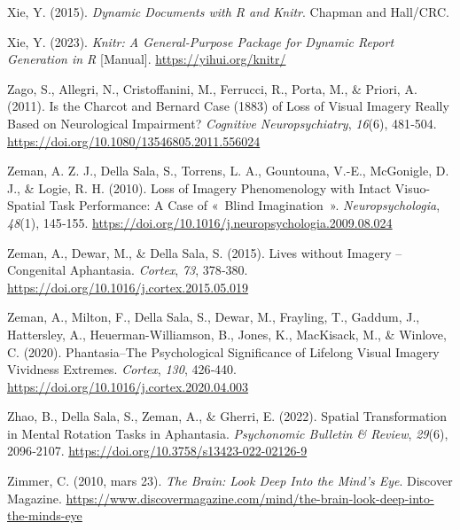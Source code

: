 \documentclass[
  12pt,
]{article}
\newlength{\cslhangindent}
\newlength{\cslentryspacingunit} %
\newenvironment{CSLReferences}[2] %
 {%
  \setlength{\parindent}{0pt}
  \ifodd #1
  \let\oldpar\par
  \def\par{\hangindent=\cslhangindent\oldpar}
  \fi
  \setlength{\parskip}{#2\cslentryspacingunit}
 }%
 {}
\begin{document}
\begin{CSLReferences}{1}{0}
\leavevmode{}%
Xie, Y. (2015). \emph{Dynamic Documents with {R} and Knitr}. {Chapman
and Hall/CRC}.

\leavevmode{}%
Xie, Y. (2023). \emph{Knitr: {A} General-Purpose Package for Dynamic
Report Generation in {R}} {[}Manual{]}. \url{https://yihui.org/knitr/}

\leavevmode{}%
Zago, S., Allegri, N., Cristoffanini, M., Ferrucci, R., Porta, M., \&
Priori, A. (2011). Is the {Charcot} and {Bernard} Case (1883) of Loss of
Visual Imagery Really Based on Neurological Impairment? \emph{Cognitive
Neuropsychiatry}, \emph{16}(6), 481‑504.
\url{https://doi.org/10.1080/13546805.2011.556024}

\leavevmode{}%
Zeman, A. Z. J., Della Sala, S., Torrens, L. A., Gountouna, V.-E.,
McGonigle, D. J., \& Logie, R. H. (2010). Loss of Imagery Phenomenology
with Intact Visuo-Spatial Task Performance: {A} Case of {«~Blind
Imagination~»}. \emph{Neuropsychologia}, \emph{48}(1), 145‑155.
\url{https://doi.org/10.1016/j.neuropsychologia.2009.08.024}

\leavevmode{}%
Zeman, A., Dewar, M., \& Della Sala, S. (2015). Lives without Imagery --
{Congenital} Aphantasia. \emph{Cortex}, \emph{73}, 378‑380.
\url{https://doi.org/10.1016/j.cortex.2015.05.019}

\leavevmode{}%
Zeman, A., Milton, F., Della Sala, S., Dewar, M., Frayling, T., Gaddum,
J., Hattersley, A., Heuerman-Williamson, B., Jones, K., MacKisack, M.,
\& Winlove, C. (2020). Phantasia--{The} Psychological Significance of
Lifelong Visual Imagery Vividness Extremes. \emph{Cortex}, \emph{130},
426‑440. \url{https://doi.org/10.1016/j.cortex.2020.04.003}

\leavevmode{}%
Zhao, B., Della Sala, S., Zeman, A., \& Gherri, E. (2022). Spatial
Transformation in Mental Rotation Tasks in Aphantasia. \emph{Psychonomic
Bulletin \& Review}, \emph{29}(6), 2096‑2107.
\url{https://doi.org/10.3758/s13423-022-02126-9}

\leavevmode{}%
Zimmer, C. (2010, mars 23). \emph{The {Brain}: {Look Deep Into} the
{Mind}'s {Eye}}. {Discover Magazine}.
\url{https://www.discovermagazine.com/mind/the-brain-look-deep-into-the-minds-eye}

\end{CSLReferences}
\end{document}
